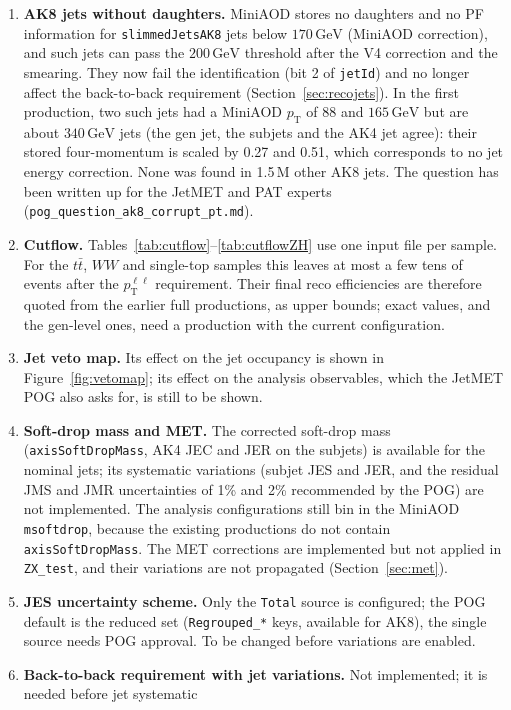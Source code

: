 \documentclass[11pt]{article}
\newcommand{\pt}{p_{\mathrm{T}}}
\newcommand{\GeV}{\ensuremath{\,\mathrm{GeV}}}
\newcommand{\ptll}{\pt^{\ell\ell}}
\newcommand{\code}[1]{\texttt{#1}}
\begin{document}
\begin{enumerate}
\item \textbf{AK8 jets without daughters.} MiniAOD stores no daughters and no PF information for \code{slimmedJetsAK8}
  jets below $170\GeV$ (MiniAOD correction), and such jets can pass the $200\GeV$ threshold after the V4 correction and
  the smearing. They now fail the identification (bit 2 of \code{jetId}) and no longer affect the back-to-back
  requirement (Section~\ref{sec:recojets}). In the first production, two such jets had a MiniAOD $\pt$ of 88 and
  $165\GeV$ but are about $340\GeV$ jets (the gen jet, the subjets and the AK4 jet agree): their stored four-momentum is
  scaled by 0.27 and 0.51, which corresponds to no jet energy correction. None was found in 1.5\,M other AK8 jets. The
  question has been written up for the JetMET and PAT experts (\code{pog\_question\_ak8\_corrupt\_pt.md}).
\item \textbf{Cutflow.} Tables~\ref{tab:cutflow}--\ref{tab:cutflowZH} use one input file per sample. For the
  $t\bar t$, $WW$ and single-top samples this leaves at most a few tens of events after the $\ptll$ requirement. Their
  final reco efficiencies are therefore quoted from the earlier full productions, as upper bounds; exact values, and
  the gen-level ones, need a production with the current configuration.
\item \textbf{Jet veto map.} Its effect on the jet occupancy is shown in Figure~\ref{fig:vetomap}; its effect on the
  analysis observables, which the JetMET POG also asks for, is still to be shown.
\item \textbf{Soft-drop mass and MET.} The corrected soft-drop mass (\code{axisSoftDropMass}, AK4 JEC and JER on the
  subjets) is available for the nominal jets; its systematic variations (subjet JES and JER, and the residual JMS and JMR
  uncertainties of 1\% and 2\% recommended by the POG) are not implemented. The analysis configurations still bin in the
  MiniAOD \code{msoftdrop}, because the existing productions do not contain \code{axisSoftDropMass}. The MET corrections are implemented but not applied in \code{ZX\_test}, and their
  variations are not propagated (Section~\ref{sec:met}).
\item \textbf{JES uncertainty scheme.} Only the \code{Total} source is configured; the POG default is the reduced set
  (\code{Regrouped\_*} keys, available for AK8), the single source needs POG approval. To be changed before
  variations are enabled.
\item \textbf{Back-to-back requirement with jet variations.} Not implemented; it is needed before jet systematic

\end{enumerate}
\end{document}
